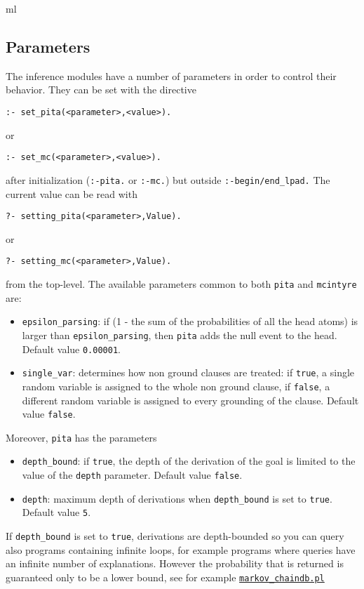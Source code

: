 ml\subsection{Parameters}
The inference modules have a number of parameters in order to control their behavior. They can be set with the directive
\begin{verbatim}
:- set_pita(<parameter>,<value>).
\end{verbatim}
or
\begin{verbatim}
:- set_mc(<parameter>,<value>).
\end{verbatim}
after initialization (\verb|:-pita.| or \verb|:-mc.|) but outside \verb|:-begin/end_lpad.|
The current value can be read with
\begin{verbatim}
?- setting_pita(<parameter>,Value).
\end{verbatim}
or
\begin{verbatim}
?- setting_mc(<parameter>,Value).
\end{verbatim}
from the top-level.
The available parameters common to both \verb|pita| and \verb|mcintyre| are:
\begin{itemize}
\item 
	 \verb|epsilon_parsing|: if (1 - the sum of the probabilities of all the head atoms) is larger than 
    \verb|epsilon_parsing|,
		then \texttt{pita} adds the null event to the head. Default value \texttt{0.00001}.
\item \verb|single_var|: determines how non ground clauses are treated: if \texttt{true}, a single random variable is assigned to the whole non ground clause, 
if \texttt{false}, a different random variable is assigned to every grounding of the clause. Default value \texttt{false}.
\end{itemize}
Moreover, \verb|pita| has the parameters
\begin{itemize}
\item \verb|depth_bound|: if \texttt{true}, the depth of the derivation of the goal is limited to the value of the \texttt{depth} parameter.  Default value \texttt{false}.
\item  \texttt{depth}: maximum depth of derivations when  \verb|depth_bound| is set to \texttt{true}. Default value \texttt{5}.
\end{itemize}
If \verb|depth_bound| is set to \verb|true|, derivations are depth-bounded so you can query also programs
containing infinite loops, for example programs where queries have an infinite number of explanations. However the probability that is returned is guaranteed only to be a lower bound,
see for example \href{http://cplint.eu/example/inference/markov_chaindb.pl}{\texttt{markov\_chaindb.pl}}

